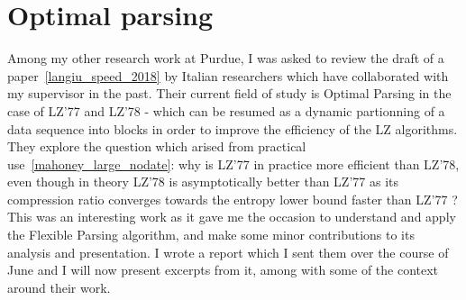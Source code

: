 \section{ Optimal parsing}

Among my other research work at Purdue, I was asked to review the draft
of a paper~\ref{langiu_speed_2018} by Italian researchers which have collaborated 
with my supervisor in the past. Their current field of study is Optimal Parsing in the case of 
LZ'77 and LZ'78 - which can be resumed as a dynamic partionning of a data 
sequence into blocks in order to improve the efficiency of the LZ algorithms.
They explore the question which arised from practical use~\ref{mahoney_large_nodate}:
why is LZ'77 in practice more efficient than LZ'78, even though in theory LZ'78 is 
asymptotically better than LZ'77 as its compression ratio converges towards
the entropy lower bound faster than LZ'77 ? This was an interesting work
as it gave me the occasion to understand and apply the Flexible Parsing 
algorithm, and make some minor contributions to its analysis and presentation.
I wrote a report which I sent them over the course of June and I will now present
excerpts from it, among with some of the context around their work.







\renewcommand{\subsection}{\subsubsection}
\renewcommand{\section}{\oldsubsection}

